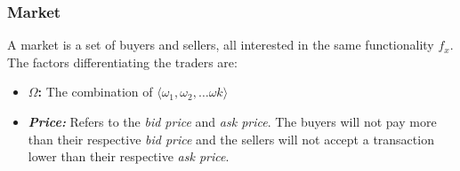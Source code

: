\documentclass[10pt,journal,compsoc]{IEEEtran}
\begin{document}
\subsubsection{Market} 
A market is a set of buyers and sellers, all interested in the same functionality $f_x$. The factors differentiating the traders are:
	\begin{itemize}
	 \item \textbf{$\Omega$:} The combination of $\langle \omega_{1}, \omega_{2}, \ldots \omega{k}\rangle$
	 \item \textbf{\textsl{Price:}} Refers to the \textsl{bid price} and \textsl{ask price}. The buyers will not pay more than their respective \textsl{bid price} and the sellers will not accept a transaction lower than their respective \textsl{ask price}. 
	\end{itemize}
\end{document}
